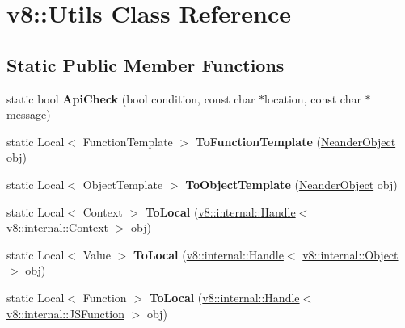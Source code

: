 \hypertarget{classv8_1_1_utils}{}\section{v8\+:\+:Utils Class Reference}
\label{classv8_1_1_utils}
\subsection*{Static Public Member Functions}
\begin{DoxyCompactItemize}
\item 
\hypertarget{classv8_1_1_utils_a1a1e634bae095bf6ff0ed2d9d737be00}{}static bool {\bfseries Api\+Check} (bool condition, const char $\ast$location, const char $\ast$message)\label{classv8_1_1_utils_a1a1e634bae095bf6ff0ed2d9d737be00}

\item 
\hypertarget{classv8_1_1_utils_a3e87b50ea80eaec33f192613755118df}{}static Local$<$ Function\+Template $>$ {\bfseries To\+Function\+Template} (\hyperlink{classv8_1_1_neander_object}{Neander\+Object} obj)\label{classv8_1_1_utils_a3e87b50ea80eaec33f192613755118df}

\item 
\hypertarget{classv8_1_1_utils_a7ae37e94d4dcac9865970e8a38d5001e}{}static Local$<$ Object\+Template $>$ {\bfseries To\+Object\+Template} (\hyperlink{classv8_1_1_neander_object}{Neander\+Object} obj)\label{classv8_1_1_utils_a7ae37e94d4dcac9865970e8a38d5001e}

\item 
\hypertarget{classv8_1_1_utils_a3e12eece90343f71b7782f7b6c0c0f7b}{}static Local$<$ Context $>$ {\bfseries To\+Local} (\hyperlink{classv8_1_1internal_1_1_handle}{v8\+::internal\+::\+Handle}$<$ \hyperlink{classv8_1_1internal_1_1_context}{v8\+::internal\+::\+Context} $>$ obj)\label{classv8_1_1_utils_a3e12eece90343f71b7782f7b6c0c0f7b}

\item 
\hypertarget{classv8_1_1_utils_ae1c9265aa9041c666f09dd8aff84c293}{}static Local$<$ Value $>$ {\bfseries To\+Local} (\hyperlink{classv8_1_1internal_1_1_handle}{v8\+::internal\+::\+Handle}$<$ \hyperlink{classv8_1_1internal_1_1_object}{v8\+::internal\+::\+Object} $>$ obj)\label{classv8_1_1_utils_ae1c9265aa9041c666f09dd8aff84c293}

\item 
\hypertarget{classv8_1_1_utils_a1c280b10d8fb7ed3cc7f7e139c9f9a42}{}static Local$<$ Function $>$ {\bfseries To\+Local} (\hyperlink{classv8_1_1internal_1_1_handle}{v8\+::internal\+::\+Handle}$<$ \hyperlink{classv8_1_1internal_1_1_j_s_function}{v8\+::internal\+::\+J\+S\+Function} $>$ obj)\label{classv8_1_1_utils_a1c280b10d8fb7ed3cc7f7e139c9f9a42}


\end{DoxyCompactItemize}
